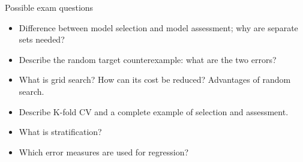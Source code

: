 \begin{boxquestion}{Possible exam questions}

\begin{itemize}
\tightlist
\item
  Difference between model selection and model assessment; why are
  separate sets needed?
\item
  Describe the random target counterexample: what are the two errors?
\item
  What is grid search? How can its cost be reduced? Advantages of
  random search.
\item
  Describe K-fold CV and a complete example of selection and
  assessment.
\item
  What is stratification?
\item
  Which error measures are used for regression?
\end{itemize}

\end{boxquestion}
